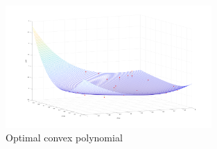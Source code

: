 \begin{enumerate}[leftmargin=*]
\begin{enumerate}[label=(\alph*)]
\begin{figure}[H]
\centerline{
\includegraphics[width=0.7\textwidth]{convex.png}}
\caption{Optimal convex polynomial}
\end{figure}

\begin{minipage}[c]{0.9\textwidth}

\end{minipage}
\end{enumerate}
\end{enumerate}







